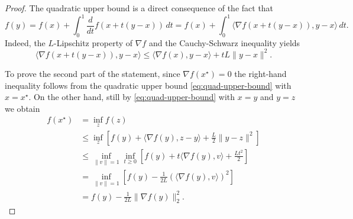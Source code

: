      \begin{proof}
         The quadratic upper bound is a direct consequence of the fact that
         \begin{equation}
             f(y)
             =f(x)+\int_0^1 \frac{d}{dt} f(x+t(y-x)) \, dt
             =f(x)+\int_0^1 \langle\nabla f(x+t(y-x)), y-x \rangle\, dt.
         \end{equation}
         Indeed, the $L$-Lipschitz property of $\nabla f$ and the Cauchy-Schwarz inequality yields
         \begin{equation}
             \langle\nabla f(x+t(y-x)), y-x \rangle
             \le \langle\nabla f(x), y-x \rangle + tL \|y-x\|^2.
         \end{equation}
 
         To prove the second part of the statement, since $\nabla f(x^\star) =0$ the right-hand inequality follows from the quadratic upper bound \eqref{eq:quad-upper-bound} with $x=x^\star$. On the other hand, still by \eqref{eq:quad-upper-bound} with $x=y$ and $y=z$ we obtain
         \begin{equation}
             \begin{split}
                 f(x^\star)
                  & = \inf_{z} f(z)                                                                                        \\
                  & \le \inf_z \left[ f(y) + \langle \nabla f(y), z-y \rangle + \frac{L}2 \|y-z\|^2 \right]                \\
                  & \le \inf_{\|v\|=1} \inf_{t\ge 0} \left[ f(y) + t\langle \nabla f(y), v \rangle + \frac{Lt^2}2  \right] \\
                  & = \inf_{\|v\|=1} \left[ f(y) - \frac{1}{2L} \left(\langle \nabla f(y),v\rangle\right)^2 \right]        \\
                  & = f(y) - \frac{1}{2L} \|\nabla f(y)\|_2^2.
             \end{split}
         \end{equation}
 

\end{proof}
